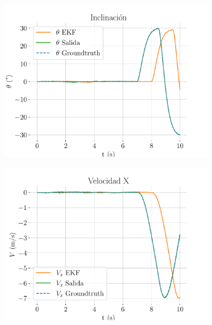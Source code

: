 \begin{figure}
\begin{subfigure}[t]{0.49\textwidth}
		\centering
		\includegraphics[width=\textwidth]{estimador_px4/im_simu/handle_delay/theta}
		\caption{}
	\end{subfigure}
	\quad
	\begin{subfigure}[t]{0.49\textwidth}
		\centering
		\includegraphics[width=\textwidth]{estimador_px4/im_simu/handle_delay/vx}
		\caption{}
	\end{subfigure}
	\quad
	\hspace*{-0.5cm}
	\begin{subfigure}[t]{0.49\textwidth}
		\centering

\end{subfigure}
\end{figure}
